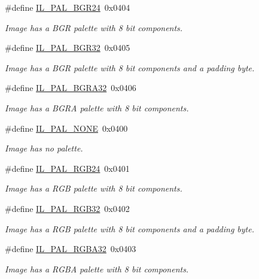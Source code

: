 \begin{DoxyCompactItemize}
\#define \hyperlink{group__il__data__types_gac29eea753768ee5bceacce41c6b89ea4}{I\+L\+\_\+\+P\+A\+L\+\_\+\+B\+G\+R24}~0x0404
\begin{DoxyCompactList}\small\item\em Image has a B\+G\+R palette with 8 bit components. \end{DoxyCompactList}\item 
\#define \hyperlink{group__il__data__types_ga134bc7f385c0a78c578b1fac3f40828c}{I\+L\+\_\+\+P\+A\+L\+\_\+\+B\+G\+R32}~0x0405
\begin{DoxyCompactList}\small\item\em Image has a B\+G\+R palette with 8 bit components and a padding byte. \end{DoxyCompactList}\item 
\#define \hyperlink{group__il__data__types_ga6e2060875624e5f64bdfa96373d4cba5}{I\+L\+\_\+\+P\+A\+L\+\_\+\+B\+G\+R\+A32}~0x0406
\begin{DoxyCompactList}\small\item\em Image has a B\+G\+R\+A palette with 8 bit components. \end{DoxyCompactList}\item 
\#define \hyperlink{group__il__data__types_ga9f7f6c5831c51bdb378bde32f9d50c28}{I\+L\+\_\+\+P\+A\+L\+\_\+\+N\+O\+N\+E}~0x0400
\begin{DoxyCompactList}\small\item\em Image has no palette. \end{DoxyCompactList}\item 
\#define \hyperlink{group__il__data__types_ga386c51b81d680eda0da404d3be5ec2b7}{I\+L\+\_\+\+P\+A\+L\+\_\+\+R\+G\+B24}~0x0401
\begin{DoxyCompactList}\small\item\em Image has a R\+G\+B palette with 8 bit components. \end{DoxyCompactList}\item 
\#define \hyperlink{group__il__data__types_ga15b2f992e9fa0d31fc5eb32d9f236aac}{I\+L\+\_\+\+P\+A\+L\+\_\+\+R\+G\+B32}~0x0402
\begin{DoxyCompactList}\small\item\em Image has a R\+G\+B palette with 8 bit components and a padding byte. \end{DoxyCompactList}\item 
\#define \hyperlink{group__il__data__types_ga0982d31eb81164fde52878e75bee6a98}{I\+L\+\_\+\+P\+A\+L\+\_\+\+R\+G\+B\+A32}~0x0403
\begin{DoxyCompactList}\small\item\em Image has a R\+G\+B\+A palette with 8 bit components. \end{DoxyCompactList}\item 

\end{DoxyCompactItemize}
